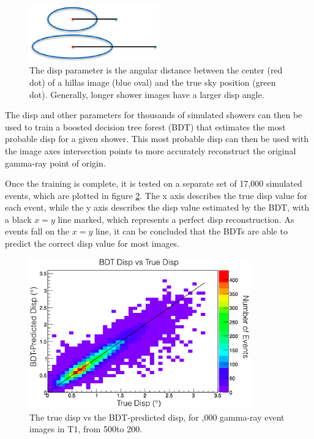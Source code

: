 \begin{figure}[ht]
  \begin{center}
    \includegraphics[width=0.5\textwidth]{images/disp_parameter_cropped.eps}
    \caption[Angular Reconstruction Disp]{The disp parameter is the angular distance between the center (red dot) of a hillas image (blue oval) and the true sky position (green dot).  Generally, longer shower images have a larger disp angle.}\label{fig:dispdiagram}
  \end{center}
\end{figure}

The disp and other parameters for thousands of simulated showers can then be used to train a boosted decision tree forest (BDT) that estimates the most probable disp for a given shower.
This most probable disp can then be used with the image axes intersection points to more accurately reconstruct the original gamma-ray point of origin.

Once the training is complete, it is tested on a separate set of 17,000 simulated events, which are plotted in figure \ref{fig:disptraining}.
The x axis describes the true disp value for each event, while the y axis describes the disp value estimated by the BDT, with a black $x=y$ line marked, which represents a perfect disp reconstruction.
As events fall on the $x=y$ line, it can be concluded that the BDTs are able to predict the correct disp value for most images.

\begin{figure}[ht]
  \begin{center}
    \includegraphics[width=0.85\textwidth]{images/disp_training.eps}
    \caption[Disp BDT Training]{The true disp vs the BDT-predicted disp, for ,000 gamma-ray event images in T1, from 500\GeV to 200\TeV.}\label{fig:disptraining}
  \end{center}
\end{figure}

